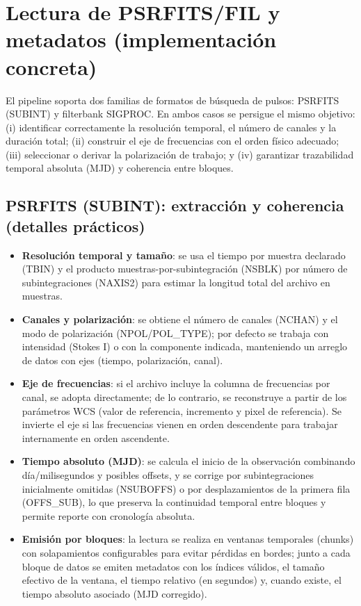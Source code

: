 
\section{Lectura de PSRFITS/FIL y metadatos (implementación concreta)}
El pipeline soporta dos familias de formatos de búsqueda de pulsos: PSRFITS (SUBINT) y filterbank SIGPROC. En ambos casos se persigue el mismo objetivo: (i) identificar correctamente la resolución temporal, el número de canales y la duración total; (ii) construir el eje de frecuencias con el orden físico adecuado; (iii) seleccionar o derivar la polarización de trabajo; y (iv) garantizar trazabilidad temporal absoluta (MJD) y coherencia entre bloques.

\subsection*{PSRFITS (SUBINT): extracción y coherencia (detalles prácticos)}
\begin{itemize}
  \item \textbf{Resolución temporal y tamaño}: se usa el tiempo por muestra declarado (TBIN) y el producto muestras-por-subintegración (NSBLK) por número de subintegraciones (NAXIS2) para estimar la longitud total del archivo en muestras.
  \item \textbf{Canales y polarización}: se obtiene el número de canales (NCHAN) y el modo de polarización (NPOL/POL\_TYPE); por defecto se trabaja con intensidad (Stokes I) o con la componente indicada, manteniendo un arreglo de datos con ejes (tiempo, polarización, canal).
  \item \textbf{Eje de frecuencias}: si el archivo incluye la columna de frecuencias por canal, se adopta directamente; de lo contrario, se reconstruye a partir de los parámetros WCS (valor de referencia, incremento y pixel de referencia). Se invierte el eje si las frecuencias vienen en orden descendente para trabajar internamente en orden ascendente.
  \item \textbf{Tiempo absoluto (MJD)}: se calcula el inicio de la observación combinando día/milisegundos y posibles offsets, y se corrige por subintegraciones inicialmente omitidas (NSUBOFFS) o por desplazamientos de la primera fila (OFFS\_SUB), lo que preserva la continuidad temporal entre bloques y permite reporte con cronología absoluta.
  \item \textbf{Emisión por bloques}: la lectura se realiza en ventanas temporales (chunks) con solapamientos configurables para evitar pérdidas en bordes; junto a cada bloque de datos se emiten metadatos con los índices válidos, el tamaño efectivo de la ventana, el tiempo relativo (en segundos) y, cuando existe, el tiempo absoluto asociado (MJD corregido).
\end{itemize}

